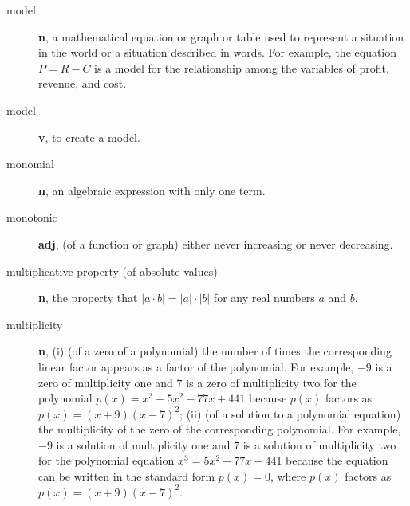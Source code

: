 \documentclass[10pt,]{book}
\newcommand{\terminology}[1]{\textbf{#1}}
\theoremstyle{plain}
\theoremstyle{definition}
\theoremstyle{definition}
\theoremstyle{definition}
\numberwithin{equation}{part}
\newcommand\abs[1]{\left|#1\right|}
\begin{document}
\begin{description}
\item[{model}]\hypertarget{li-682}{}\terminology{n}, a mathematical equation or graph or table used to represent a situation in the world or a situation described in words. For example, the equation \(P = R − C\) is a model for the relationship among the variables of profit, revenue, and cost.%
\item[{model}]\hypertarget{li-683}{}\terminology{v}, to create a model.%
\item[{monomial}]\hypertarget{li-684}{}\terminology{n}, an algebraic expression with only one term.%
\item[{monotonic}]\hypertarget{li-685}{}\terminology{adj}, (of a function or graph) either never increasing or never decreasing.%
\item[{multiplicative property (of absolute values)}]\hypertarget{li-686}{}\terminology{n}, the property that \(\abs{a\cdot b} = \abs{a}\cdot\abs{b}\) for any real numbers \(a\) and \(b\).%
\item[{multiplicity}]\hypertarget{li-687}{}\terminology{n}, (i) (of a zero of a polynomial) the number of times the corresponding linear factor appears as a factor of the polynomial. For example, \(-9\) is a zero of multiplicity one and \(7\) is a zero of multiplicity two for the polynomial \(p(x) =x^3 − 5x^2 − 77x + 441\) because \(p(x)\) factors as \(p(x) =(x + 9) (x − 7)^2\); (ii) (of a solution to a polynomial equation) the multiplicity of the zero of the corresponding polynomial. For example, \(−9\) is a solution of multiplicity one and \(7\) is a solution of multiplicity two for the polynomial equation \(x^3 = 5x^2 + 77x − 441\) because the equation can be written in the standard form \(p(x) = 0\), where \(p(x)\) factors as \(p(x) =(x + 9)(x − 7)^2\).%
\end{description}
%
\typeout{************************************************}
\typeout{************************************************}
\end{document}
